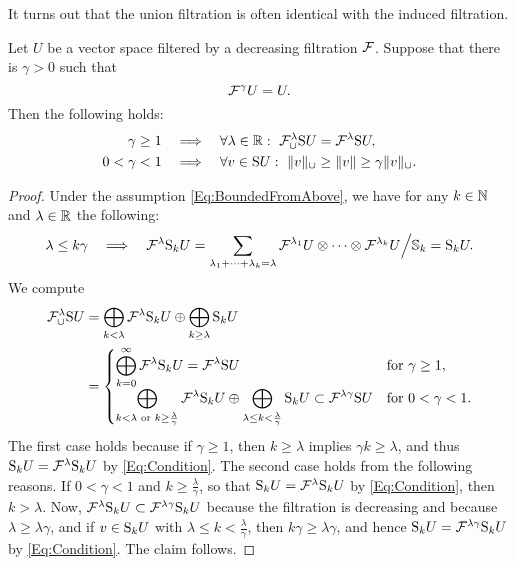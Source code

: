 \documentclass[\MainFolder/Text.tex]{subfiles}
\begin{document}
It turns out that the union filtration is often identical with the induced filtration.

\begin{Lemma}\label{Lem:BoundCondOnFiltr}
Let $U$ be a vector space filtered by a decreasing filtration $\mathcal{F}$. Suppose that there is $\gamma > 0$ such that
\begin{equation}\label{Eq:BoundedFromAbove}
\mathcal{F}^\gamma U = U. 
\end{equation}
Then the following holds:
\begin{align*}
 \gamma\ge 1\quad&\Implies\quad\forall\lambda\in\R:\ \Filtr^\lambda_\cup \Sym U = \Filtr^\lambda \Sym U,\\
 0<\gamma < 1\quad&\Implies\quad\forall v\in \Sym U:\ \Norm{v}_\cup \ge \Norm{v}\ge \gamma\Norm{v}_\cup.
\end{align*}
\end{Lemma}
\begin{proof}
Under the assumption \eqref{Eq:BoundedFromAbove}, we have for any $k\in \mathbb{N}$ and $\lambda\in\mathbb{R}$ the following:
\begin{equation}\label{Eq:Condition}
\lambda\le k \gamma\quad \Longrightarrow\quad \mathcal{F}^\lambda \mathrm{S}_k U = \sum_{\lambda_1 + \dotsb + \lambda_k = \lambda} \mathcal{F}^{\lambda_1}U \otimes \dotsb \otimes \mathcal{F}^{\lambda_k} U \Bigl/ \mathbb{S}_k = \mathrm{S}_k U.
\end{equation}
We compute
\begin{align*}
\mathcal{F}_\cup^\lambda \mathrm{S} U &= \bigoplus_{k<\lambda}\mathcal{F}^{\lambda}\mathrm{S}_k U \oplus  \bigoplus_{k\ge \lambda} \mathrm{S}_k U \\
&= \begin{cases}
     \displaystyle\bigoplus_{k=0}^\infty \mathcal{F}^\lambda \mathrm{S}_k U = \mathcal{F}^\lambda \mathrm{S} U & \text{for } \gamma \ge 1, \\
    \displaystyle\bigoplus_{\substack{k<\lambda\text{ or }k\ge\frac{\lambda}{\gamma}}} \mathcal{F}^\lambda \mathrm{S}_k U \oplus \bigoplus_{\lambda \le k < \frac{\lambda}{\gamma}}\mathrm{S}_k U\subset \mathcal{F}^{\lambda\gamma} \mathrm{S} U& \text{for }0<\gamma< 1.
   \end{cases}
\end{align*}
The first case holds because if $\gamma\ge 1$, then $k\ge \lambda$ implies $\gamma k \ge \lambda$, and thus $\mathrm{S}_k U = \mathcal{F}^\lambda \mathrm{S}_k U$ by \eqref{Eq:Condition}. The second case holds from the following reasons. If $0<\gamma<1$ and $k\ge \frac{\lambda}{\gamma}$, so that $\mathrm{S}_k U = \mathcal{F}^\lambda \mathrm{S}_k U$ by \eqref{Eq:Condition}, then $k>\lambda$. Now, $\mathcal{F}^\lambda \mathrm{S}_k U \subset \mathcal{F}^{\lambda \gamma} \mathrm{S}_k U$ because the filtration is decreasing and because $\lambda \ge \lambda \gamma$, and if $v\in \mathrm{S}_k U$ with $\lambda \le k < \frac{\lambda}{\gamma}$, then $k\gamma \ge \lambda \gamma$, and hence $\mathrm{S}_k U = \mathcal{F}^{\lambda\gamma}\mathrm{S}_k U$ by \eqref{Eq:Condition}. The claim follows.
\end{proof}
\end{document}
